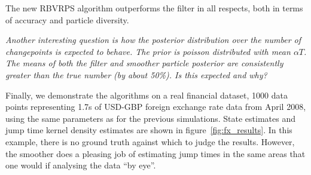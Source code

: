 \documentclass[journal]{IEEEtran}
\newenvironment{meta}[0]{\color{red} \em}{}
\begin{document}
The new RBVRPS algorithm outperforms the filter in all respects, both in terms of accuracy and particle diversity.

\begin{meta}
Another interesting question is how the posterior distribution over the number of changepoints is expected to behave. The prior is poisson distributed with mean $\alpha T$. The means of both the filter and smoother particle posterior are consistently greater than the true number (by about 50\%). Is this expected and why? 
\end{meta}

Finally, we demonstrate the algorithms on a real financial dataset, 1000 data points representing 1.7s of USD-GBP foreign exchange rate data from April 2008, using the same parameters as for the previous simulations. State estimates and jump time kernel density estimates are shown in figure~\ref{fig:fx_results}. In this example, there is no ground truth against which to judge the results. However, the smoother does a pleasing job of estimating jump times in the same areas that one would if analysing the data ``by eye''.
\end{document}
